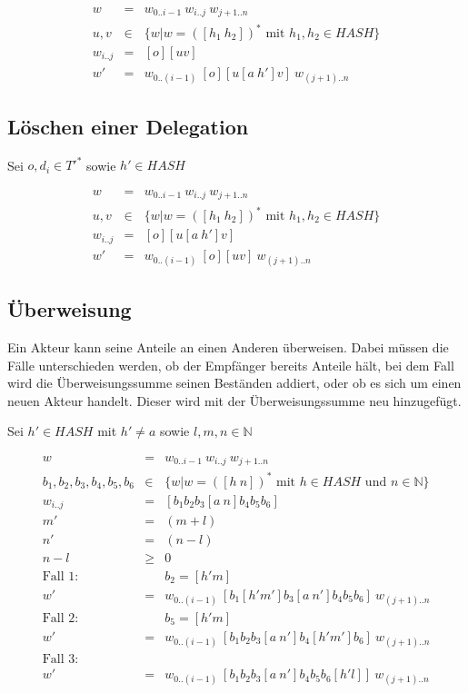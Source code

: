 \documentclass[a4paper,12pt]{report}
\begin{document}
\begin{eqnarray}
  w &=& w_{0 .. i-1}\ w_{i..j}\ w_{j+1 .. n} \\
  u,v &\in& \{ w | w = ([h_1\ h_2])^*\text{ mit } h_1,h_2 \in HASH \} \\
  w_{i..j} &=& [o][uv] \\
  w' &=& w_{0 .. (i-1)}\ [o][u[a\ h']v]\ w_{(j+1) .. n}
\end{eqnarray}

\subsection*{Löschen einer Delegation}

Sei $o,d_i \in T'^*$ sowie $h'\in HASH$

\begin{eqnarray}
  w &=& w_{0 .. i-1}\ w_{i..j}\ w_{j+1 .. n} \\
  u,v &\in& \{ w | w = ([h_1\ h_2])^*\text{ mit } h_1,h_2 \in HASH \} \\
  w_{i..j} &=& [o][u[a\ h']v] \\
  w' &=& w_{0 .. (i-1)}\ [o][uv]\ w_{(j+1) .. n}
\end{eqnarray}

\subsection*{Überweisung}

Ein Akteur kann seine Anteile an einen Anderen überweisen. Dabei müssen die Fälle unterschieden werden, ob der Empfänger bereits Anteile hält, bei dem Fall wird die Überweisungssumme seinen Beständen addiert, oder ob es sich um einen neuen Akteur handelt. Dieser wird mit der Überweisungssumme neu hinzugefügt. 

Sei $h'\in HASH$ mit $h' \neq a$ sowie $l,m,n\in\mathbb{N}$

\begin{eqnarray}
  w &=& w_{0 .. i-1}\ w_{i..j}\ w_{j+1 .. n} \\
  b_1, b_2, b_3, b_4, b_5, b_6 &\in& \{ w | w = ([h\ n])^*\text{ mit } h \in HASH\text{ und }n\in\mathbb{N} \} \\
  w_{i..j} &=& [ b_1 b_2 b_3 [a\ n] b_4 b_5 b_6 ] \\
  m' &=& (m+l) \\
  n' &=& (n-l) \\
  n - l &\geq& 0\\
  \text{Fall 1: } &&b_2 = [h' m]\\
  w' &=& w_{0 .. (i-1)}\ [ b_1 [h' m'] b_3 [a\ n'] b_4 b_5 b_6 ]\ w_{(j+1) .. n} \\
  \text{Fall 2: } &&b_5 = [h' m]\\
  w' &=& w_{0 .. (i-1)}\ [ b_1 b_2 b_3 [a\ n'] b_4 [h' m'] b_6 ]\ w_{(j+1) .. n}\\
  \text{Fall 3: } && \\
  w' &=& w_{0 .. (i-1)}\ [ b_1 b_2 b_3 [a\ n'] b_4 b_5 b_6 [h' l]]\ w_{(j+1) .. n}
\end{eqnarray}
\end{document}
